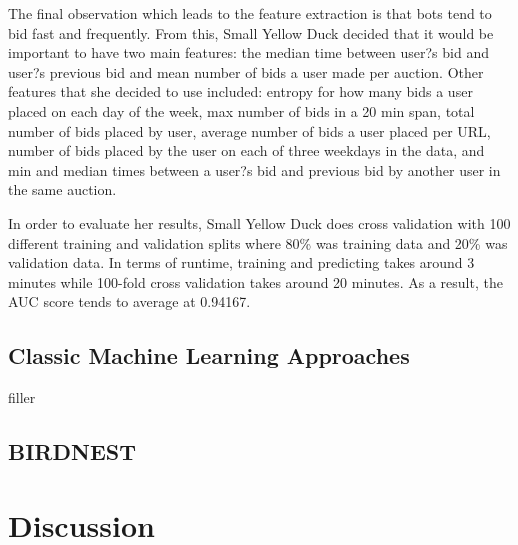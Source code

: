 \documentclass{article} %
\begin{document}
The final observation which leads to the feature extraction is that bots tend to bid fast and frequently.
From this, Small Yellow Duck decided that it would be important to have two main features: the median time between user?s bid and user?s previous bid and mean number of bids a user made per auction.
Other features that she decided to use included: entropy for how many bids a user placed on each day of the week, max number of bids in a 20 min span, total number of bids placed by user, average number of bids a user placed per URL, number of bids placed by the user on each of three weekdays in the data, and min and median times between a user?s bid and previous bid by another user in the same auction.

In order to evaluate her results, Small Yellow Duck does cross validation with 100 different training and validation splits where 80\% was training data and 20\% was validation data.
In terms of runtime, training and predicting takes around 3 minutes while 100-fold cross validation takes around 20 minutes.
As a result, the AUC score tends to average at 0.94167.

\subsection{Classic Machine Learning Approaches}

filler

\subsection{BIRDNEST}

\section{Discussion}

\begin{thebibliography}{123}


\end{thebibliography}
\end{document}
